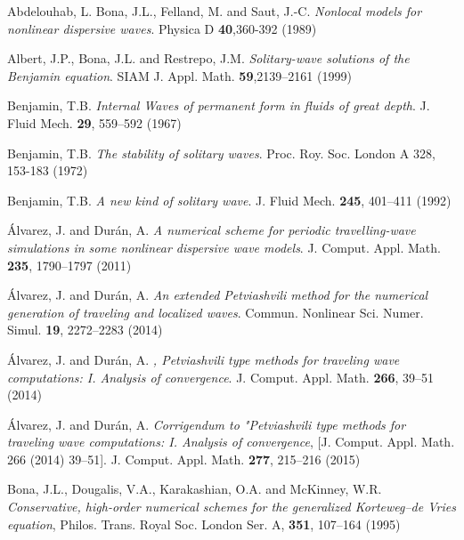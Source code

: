 \begin{thebibliography}{}
%
%

 Abdelouhab, L. Bona, J.L., Felland, M. and Saut, J.-C. 
     {\em Nonlocal models for nonlinear dispersive waves}.
     Physica D \textbf{40},360-392 (1989) 


 Albert, J.P., Bona, J.L. and Restrepo, J.M. 
{\em Solitary-wave solutions of the Benjamin equation}.
SIAM J. Appl. Math. \textbf{59},2139--2161 (1999) 


 Benjamin, T.B.
          {\em Internal Waves of permanent form in fluids of great depth}.
          J. Fluid Mech.  \textbf{29}, 559--592 (1967)


 Benjamin, T.B.
               {\em The stability of solitary waves}.
              Proc. Roy. Soc. London A 328, 153-183 (1972) 

 Benjamin, T.B. 
          {\emph{A new kind of solitary wave}}.
          J. Fluid Mech. \textbf{245}, 401--411  (1992)

 \'{A}lvarez, J. and  Dur\'{a}n, A.
{\em A numerical scheme for periodic travelling-wave simulations in some nonlinear dispersive wave models}.
J. Comput. Appl. Math. \textbf{235}, 1790--1797 (2011)

 \'{A}lvarez, J. and  Dur\'{a}n, A.
{\em An extended Petviashvili method for the numerical generation of traveling and localized waves}.
Commun. Nonlinear Sci. Numer. Simul. \textbf{19}, 2272--2283 (2014)

 \'{A}lvarez, J. and  Dur\'{a}n, A.
{\em, Petviashvili type methods for traveling wave computations: I. Analysis of convergence}.
J. Comput. Appl. Math. \textbf{266}, 39--51 (2014)

 \'{A}lvarez, J. and  Dur\'{a}n, A.
{\em Corrigendum to "Petviashvili type methods for traveling wave computations: I. Analysis of convergence},
[J. Comput. Appl. Math. 266 (2014) 39--51]. J. Comput. Appl. Math. \textbf{277}, 215--216 (2015)


 Bona, J.L., Dougalis, V.A.,  Karakashian, O.A. and McKinney, W.R.
   {\em Conservative, high-order numerical schemes for the generalized
   Korteweg--de Vries equation},
   Philos. Trans. Royal Soc. London Ser. A, \textbf{351}, 107--164 (1995)



\end{thebibliography}
